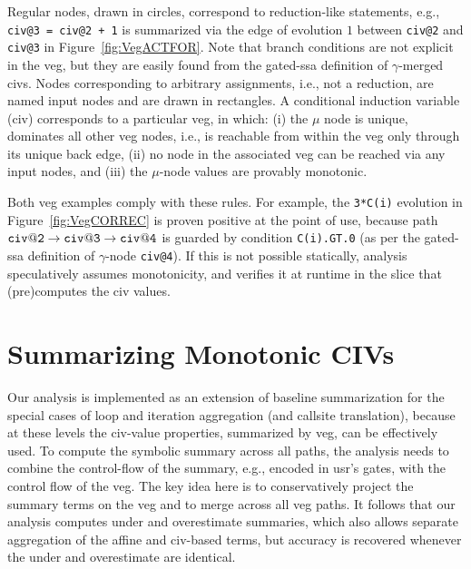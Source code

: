\documentclass{sig-alternate}
\begin{document}
Regular nodes, drawn in circles, correspond to reduction-like statements,
e.g., {\tt civ@3 = civ@2 + 1} is summarized via the edge 
of evolution $1$ between {\tt civ@2} and {\tt civ@3} in Figure~\ref{fig:VegACTFOR}.
%
Note that branch conditions are not explicit in the {\sc veg}, 
but they are easily found from the gated-{\sc ssa} definition 
of $\gamma$-merged {\sc civ}s. %
%
Nodes corresponding to arbitrary assignments, i.e., not a reduction, are
named input nodes and are drawn in rectangles. 
%
A conditional induction variable ({\sc civ}) corresponds to a
particular {\sc veg}, in which:
  (i) the $\mu$ node is unique, dominates all other {\sc veg} nodes,
            i.e., is reachable from within the {\sc veg} only through its
            unique back edge, %
%
 (ii) no node in the associated {\sc veg} can be reached via any input nodes, and 
%
(iii) the $\mu$-node values are provably monotonic.
            
Both {\sc veg} examples comply with these rules.
For example, the {\tt 3*C(i)} evolution in 
Figure~\ref{fig:VegCORREC} is proven positive at the 
point of use, because path 
${\tt civ@2}\rightarrow{\tt civ@3}\rightarrow{\tt civ@4}$
is guarded by condition {\tt C(i).GT.0} (as per the 
gated-{\sc ssa} definition of $\gamma$-node {\tt civ@4}).
If this is not possible statically, analysis speculatively
assumes monotonicity, and verifies it at runtime in the slice 
that (pre)computes the {\sc civ} values. 


\section{Summarizing Monotonic CIVs}
\label{sec:MonotonicCiv}

Our analysis is implemented as an extension of baseline 
summarization for the special cases of loop and iteration 
aggregation (and callsite translation), because at these 
levels the {\sc civ}-value properties, summarized by 
{\sc veg}, can be effectively used.
%
To compute the symbolic summary across all paths, the analysis
needs to combine the control-flow of the summary, e.g., 
encoded in {\sc usr}'s gates, with the control flow of the {\sc veg}. 
The key idea here is to conservatively project the summary terms 
on the {\sc veg} and to merge across all {\sc veg} paths.
It follows that our analysis computes under and overestimate
summaries, which also allows separate aggregation of the affine 
and {\sc civ}-based terms, but accuracy is recovered whenever
the under and overestimate are identical.
 
\end{document}

